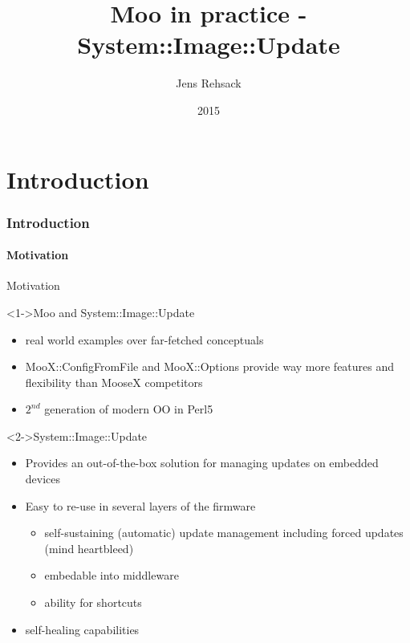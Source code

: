 \documentclass[ngerman,xcolor={table,dvipsnames},smaller,compress,hyperref={bookmarks,colorlinks}]{beamer}%
\title{Moo in practice - System::Image::Update}
\author{Jens Rehsack}
\institute[Niederrhein.PM]{Niederrhein Perl Mongers}
\date{2015}
\begin{document}


\frame{\maketitle}

\part{Introduction}

\section{Introduction}

\subsection{Motivation}

\begin{frame}[t,fragile]{Motivation}

\begin{block}<1->{Moo and System::Image::Update}
\begin{itemize}
\item real world examples over far-fetched conceptuals
\item MooX::ConfigFromFile and MooX::Options provide way more features and flexibility than MooseX competitors
\item $ 2^{nd} $ generation of modern OO in Perl5
\end{itemize}
\end{block}

\begin{block}<2->{System::Image::Update}
\begin{itemize}
\item Provides an out-of-the-box solution for managing updates on embedded devices
\item Easy to re-use in several layers of the firmware
    \begin{itemize}
    \item self-sustaining (automatic) update management including forced updates (mind heartbleed)
    \item embedable into middleware
    \item ability for shortcuts
    \end{itemize}
\item self-healing capabilities
\end{itemize}
\end{block}

\end{frame}
\end{document}
